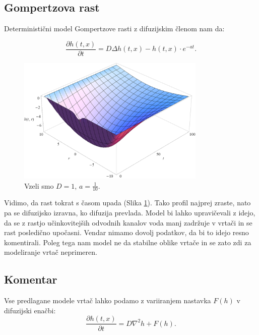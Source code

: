 \documentclass[a4paper, twoside, 12pt]{book}
\begin{document}
    \subsection{Gompertzova rast}

    Deterministični model Gompertzove rasti z difuzijskim členom nam da:

    \begin{equation}
      \frac{ \partial h(t,x) }{ \partial t} = D \Delta h(t,x) - h(t,x) \cdot e^{-a t}.
      \label{difuzija-gompertzova-rast}
    \end{equation}
    \begin{figure}[h]
      \begin{center}
        \includegraphics[width=9cm]{slike/difuzija-gompertzova-rast2}
      \end{center}
      \caption{Vzeli smo $D=1$, $a=\frac{1}{10}$.}
      \label{fig:difuzija-gompertzova-rast}
    \end{figure}

    Vidimo, da rast tokrat s časom upada (Slika \ref{fig:difuzija-gompertzova-rast}). Tako profil najprej zraste, nato pa se difuzijsko izravna, ko difuzija prevlada.
    Model bi lahko upravičevali z idejo, da se z rastjo učinkovitejših odvodnih kanalov voda manj zadržuje v vrtači in se rast posledično upočasni. Vendar nimamo dovolj podatkov, da bi to idejo resno komentirali. Poleg tega nam model ne da stabilne oblike vrtače in se zato zdi za modeliranje vrtač neprimeren.

\subsection{Komentar}

Vse predlagane modele vrtač lahko podamo z variiranjem nastavka $F(h)$ v difuzijski enačbi:
\begin{equation}
  \frac{ \partial h(t,x) }{ \partial t} = D \nabla^2 h + F(h).
  \label{dinamicna-splosna3}
\end{equation}
\end{document}
